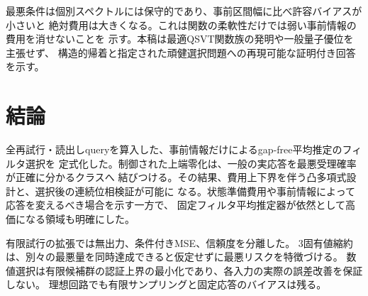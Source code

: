 \documentclass[11pt,a4paper]{article}
\begin{document}
最悪条件は個別スペクトルには保守的であり、事前区間幅に比べ許容バイアスが小さいと
絶対費用は大きくなる。これは関数の柔軟性だけでは弱い事前情報の費用を消せないことを
示す。本稿は最適QSVT関数族の発明や一般量子優位を主張せず、
構造的帰着と指定された頑健選択問題への再現可能な証明付き回答を示す。

\section{結論}
全再試行・読出しqueryを算入した、事前情報だけによるgap-free平均推定のフィルタ選択を
定式化した。制御された上端零化は、一般の実応答を最悪受理確率が正確に分かるクラスへ
結びつける。その結果、費用上下界を伴う凸多項式設計と、選択後の連続位相検証が可能に
なる。状態準備費用や事前情報によって応答を変えるべき場合を示す一方で、
固定フィルタ平均推定器が依然として高価になる領域も明確にした。

有限試行の拡張では無出力、条件付きMSE、信頼度を分離した。
3固有値縮約は、別々の最悪量を同時達成できると仮定せずに最悪リスクを特徴づける。
数値選択は有限候補群の認証上界の最小化であり、各入力の実際の誤差改善を保証しない。
理想回路でも有限サンプリングと固定応答のバイアスは残る。

\appendix


\end{document}
